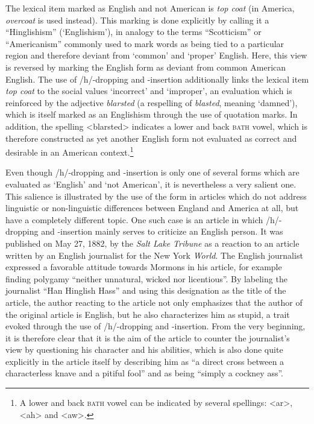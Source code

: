 The lexical item marked as English and not American is \emph{top coat} (in America, \emph{overcoat} is used instead). This marking is done explicitly by calling it a “Hinglishism” (‘Englishism’), in analogy to the terms “Scotticism” or “Americanism” commonly used to mark words as being tied to a particular region and therefore deviant from ‘common’ and ‘proper’ English. Here, this view is reversed by marking the English form as deviant from common American English. The use of /h/-dropping and -insertion additionally links the lexical item \emph{top coat} to the social values ‘incorrect’ and ‘improper’, an evaluation which is reinforced by the adjective \emph{blarsted} (a respelling of \emph{blasted}, meaning ‘damned’), which is itself marked as an Englishism through the use of quotation marks. In addition, the spelling <blarsted> indicates a lower and back \textsc{bath} vowel, which is therefore constructed as yet another English form not evaluated as correct and desirable in an American context.\footnote{A lower and back \textsc{bath} vowel can be indicated by several spellings: <ar>, <ah> and <aw>.}


Even though /h/-dropping and -insertion is only one of several forms which are evaluated as ‘English’ and ‘not American’, it is nevertheless a very salient one. This salience is illustrated by the use of the form in articles which do not address linguistic or non-linguistic differences between England and America at all, but have a completely different topic. One such case is an article in which /h/-dropping and -insertion mainly serves to criticize an English person. It was published on May 27, 1882, by the \emph{Salt Lake Tribune} as a reaction to an article written by an English journalist for the New York \emph{World}. The English journalist expressed a favorable attitude towards Mormons in his article, for example finding polygamy “neither unnatural, wicked nor licentious”. By labeling the journalist “Han Hinglish Hass” and using this designation as the title of the article, the author reacting to the article not only emphasizes that the author of the original article is English, but he also characterizes him as stupid, a trait evoked through the use of /h/-dropping and -insertion. From the very beginning, it is therefore clear that it is the aim of the article to counter the journalist’s view by questioning his character and his abilities, which is also done quite explicitly in the article itself by describing him as “a direct cross between a characterless knave and a pitiful fool” and as being “simply a cockney ass”.


